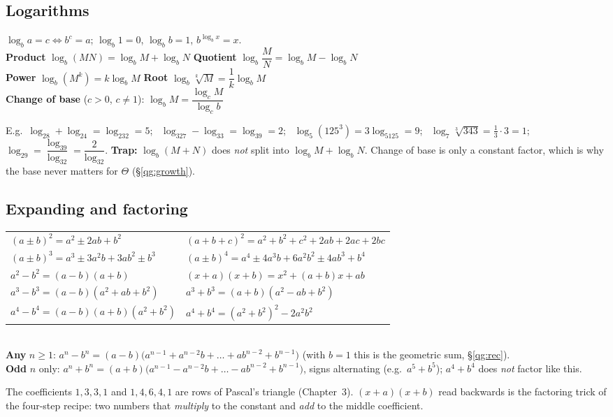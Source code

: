 \documentclass{fkt-notes}
\theoremstyle{definition}
\begin{document}
\subsection*{Logarithms}
%
\begin{rulebox}[title={Logarithm rules ($b>0$, $b\neq1$; every argument $>0$)}]
  $\log_ba=c\iff b^c=a$; \qquad $\log_b1=0$, \quad $\log_bb=1$, \quad
  $b^{\log_bx}=x$.\\[3pt]
  \textbf{Product} $\log_b(MN)=\log_bM+\log_bN$ \qquad
  \textbf{Quotient} $\log_b\dfrac MN=\log_bM-\log_bN$\\[3pt]
  \textbf{Power} $\log_b(M^k)=k\log_bM$ \qquad
  \textbf{Root} $\log_b\sqrt[k]M=\dfrac1k\log_bM$\\[3pt]
  \textbf{Change of base} ($c>0$, $c\neq1$): \quad $\log_bM=\dfrac{\log_cM}{\log_cb}$
\end{rulebox}
E.g.\ $\log_28+\log_24=\log_232=5$; \ $\log_327-\log_33=\log_39=2$; \
$\log_5(125^3)=3\log_5125=9$; \ $\log_7\sqrt[3]{343}=\frac13\cdot3=1$; \
$\log_29=\dfrac{\log_39}{\log_32}=\dfrac2{\log_32}$.
\textbf{Trap:} $\log_b(M+N)$ does \emph{not} split into $\log_bM+\log_bN$.
Change of base is only a constant factor, which is why the base never
matters for $\Theta$ (\S\ref{qg:growth}).

\subsection*{Expanding and factoring}
\index{factoring}%
\begin{rulepar}
  \renewcommand{\arraystretch}{1.6}
  \begin{tabular}{@{}l@{\qquad}l@{}}
    $(a\pm b)^2=a^2\pm2ab+b^2$ & $(a+b+c)^2=a^2+b^2+c^2+2ab+2ac+2bc$ \\
    $(a\pm b)^3=a^3\pm3a^2b+3ab^2\pm b^3$ & $(a\pm b)^4=a^4\pm4a^3b+6a^2b^2\pm4ab^3+b^4$ \\
    $a^2-b^2=(a-b)(a+b)$ & $(x+a)(x+b)=x^2+(a+b)x+ab$ \\
    $a^3-b^3=(a-b)(a^2+ab+b^2)$ & $a^3+b^3=(a+b)(a^2-ab+b^2)$ \\
    $a^4-b^4=(a-b)(a+b)(a^2+b^2)$ & $a^4+b^4=(a^2+b^2)^2-2a^2b^2$
  \end{tabular}\\[4pt]
  \textbf{Any} $n\ge1$: $a^n-b^n=(a-b)\bigl(a^{n-1}+a^{n-2}b+\dots+ab^{n-2}+b^{n-1}\bigr)$
  (with $b=1$ this is the geometric sum, \S\ref{qg:rec}).\\
  \textbf{Odd} $n$ only: $a^n+b^n=(a+b)\bigl(a^{n-1}-a^{n-2}b+\dots-ab^{n-2}+b^{n-1}\bigr)$,
  signs alternating (e.g.\ $a^5+b^5$); $a^4+b^4$ does \emph{not} factor like this.
\end{rulepar}
The coefficients $1,3,3,1$ and $1,4,6,4,1$ are rows of Pascal's triangle
(Chapter~3). $(x+a)(x+b)$ read backwards is the factoring trick of the
four-step recipe: two numbers that \emph{multiply} to the constant and
\emph{add} to the middle coefficient.
\end{document}
